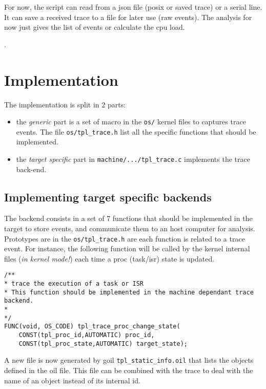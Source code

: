 For now, the script can read from a json file (posix or saved trace) or a serial line. It can save a received trace to a file for later use (raw events). The analysis for now just gives the list of events or calculate the cpu load.

.

\section{Implementation}
The implementation is split in 2 parts:
\begin{itemize}
	\item the \emph{generic} part is a set of macro in the \texttt{os/} kernel files to captures trace events. The file \texttt{os/tpl_trace.h} list all the specific functions that should be implemented.
	\item the \emph{target specific} part in \lstinline{machine/.../tpl_trace.c} implements the trace back-end. 
\end{itemize}

\subsection{Implementing target specific backends}
\label{sec:trace:targetbackend}

The backend consists in a set of 7 functions that should be implemented in the target to store events, and communicate them to an host computer for analysis. Prototypes are in the \texttt{os/tpl_trace.h} are each function is related to a trace event. For instance, the following function will be called by the kernel internal files (\emph{in kernel mode!}) each time a proc (task/isr) state is updated.

\begin{lstlisting}
/**
* trace the execution of a task or ISR
* This function should be implemented in the machine dependant trace backend.
*
*/
FUNC(void, OS_CODE) tpl_trace_proc_change_state(
    CONST(tpl_proc_id,AUTOMATIC) proc_id,
    CONST(tpl_proc_state,AUTOMATIC) target_state);
\end{lstlisting}

A new file is now generated by goil \texttt{tpl_static_info.oil} that lists the objects defined in the oil file. This file can be combined with the trace to deal with the name of an object instead of its internal id.


